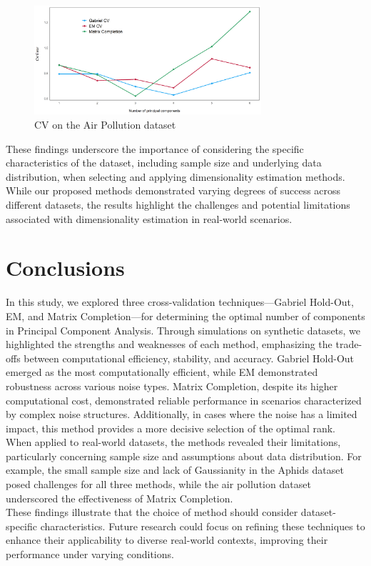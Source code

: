 \documentclass{article}
\begin{document}
\begin{figure}[h!]
    \centering
    \includegraphics[width=0.75\textwidth]{pollution.png}
    \caption{CV on the Air Pollution dataset}
    \label{fig:pollution}
\end{figure}
These findings underscore the importance of considering the specific characteristics of the dataset, 
including sample size and underlying data distribution, when selecting and applying dimensionality estimation 
methods. While our proposed methods demonstrated varying degrees of success across different datasets, the 
results highlight the challenges and potential limitations associated with dimensionality estimation in 
real-world scenarios.

\section{Conclusions}
In this study, we explored three cross-validation techniques—Gabriel Hold-Out, EM, 
and Matrix Completion—for determining the optimal number of components in Principal Component Analysis. 
Through simulations on synthetic datasets, we highlighted the strengths and weaknesses of each method, 
emphasizing the trade-offs between computational efficiency, stability, and accuracy. Gabriel Hold-Out 
emerged as the most computationally efficient, while EM demonstrated robustness across various noise types. 
Matrix Completion, despite its higher computational cost, demonstrated reliable performance in scenarios characterized
 by complex noise structures. Additionally, in cases where the noise has a limited impact, this method provides a more 
 decisive selection of the optimal rank.\\
When applied to real-world datasets, the methods revealed their limitations, particularly concerning sample size 
and assumptions about data distribution. For example, the small sample size and lack of Gaussianity in the Aphids 
dataset posed challenges for all three methods, while the air pollution dataset underscored the effectiveness of Matrix Completion.\\
These findings illustrate that the choice of method should consider dataset-specific characteristics. Future research could 
focus on refining these techniques to enhance their applicability to diverse real-world contexts, improving their performance 
under varying conditions.
\end{document}
